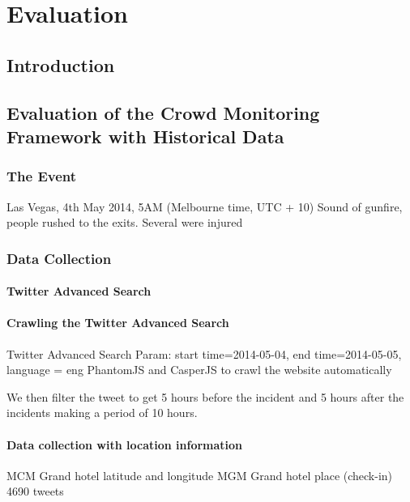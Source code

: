 \chapter{Evaluation}
\label{ch:eval}
\ifpdf
    \graphicspath{{Chapter5/Figs/Raster/}{Chapter5/Figs/PDF/}{Chapter5/Figs/}}
\else
    \graphicspath{{Chapter5/Figs/Vector/}{Chapter5/Figs/}}
\fi

\section{Introduction}

\section{Evaluation of the Crowd Monitoring Framework with Historical Data}

\subsection{The Event}
Las Vegas, 4th May 2014, 5AM (Melbourne time, UTC + 10) 
Sound of gunfire, people rushed to the exits. Several were injured

\subsection{Data Collection}

\subsubsection{Twitter Advanced Search}

\subsubsection{Crawling the Twitter Advanced Search}
Twitter Advanced Search
Param: start time=2014-05-04, end time=2014-05-05, language = eng
PhantomJS and CasperJS to crawl the website automatically

We then filter the tweet to get 5 hours before the incident and 5 hours after the incidents making a period of 10 hours.

\subsubsection{Data collection with location information}
MCM Grand hotel latitude and longitude
MGM Grand hotel place (check-in)
4690 tweets

